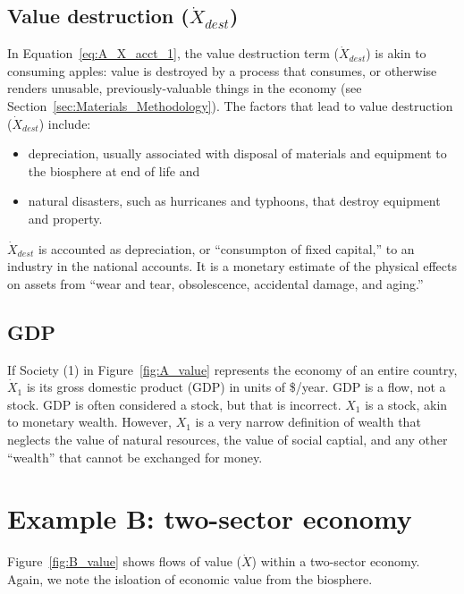 \subsection[Value destruction]{Value destruction ($\dot{X}_{dest}$)}

\noindent In Equation~\ref{eq:A_X_acct_1}, 
the value destruction term ($\dot{X}_{dest}$)
is akin to consuming apples: 
value is destroyed by a process that consumes, 
or otherwise renders unusable, 
previously-valuable things in the economy
(see Section~\ref{sec:Materials_Methodology}).
The factors that lead to value destruction
($\dot{X}_{dest}$) include:
%
\begin{itemize}
	\item{depreciation, usually associated with disposal of 
	materials and equipment to the biosphere at end of life and}
	\item{natural disasters, such as hurricanes and typhoons,
	that destroy equipment and property.}
\end{itemize}

$\dot{X}_{dest}$ is accounted as depreciation, 
or ``consumpton of fixed capital,'' %
to an industry in the national accounts. 
It is a monetary estimate of the physical effects on assets from 
``wear and tear, obsolescence, accidental damage,
and aging.''~\cite{katz2008} 


\subsection{GDP}

If Society (1) in Figure~\ref{fig:A_value} represents 
the economy of an entire country, 
$\dot{X}_{1}$ is its gross domestic product (GDP)
in units of \$/year. 
GDP is a flow, not a stock. 
GDP is often considered a stock, but that is incorrect. 
$X_{1}$ is a stock, akin to monetary wealth. 
However, $X_{1}$ is a very
narrow definition of wealth
that neglects the value of natural resources, 
the value of social captial, and any
other ``wealth'' that cannot be exchanged for money. 


\section{Example B: two-sector economy} %

Figure~\ref{fig:B_value} shows flows of value ($\dot{X}$) 
within a two-sector economy. 
Again, we note the isloation of economic value from the biosphere.

